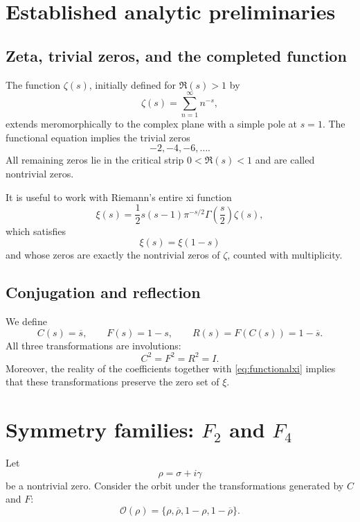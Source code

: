 \documentclass[11pt]{amsart}
\theoremstyle{definition}
\theoremstyle{remark}
\begin{document}
\section{Established analytic preliminaries}
\subsection{Zeta, trivial zeros, and the completed function}
The function $\zeta(s)$, initially defined for $\Re(s)>1$ by
\begin{equation}
  \zeta(s)=\sum_{n=1}^{\infty}n^{-s},
\end{equation}
extends meromorphically to the complex plane with a simple pole at $s=1$. The functional equation implies the trivial zeros
\begin{equation}
  -2,-4,-6,\ldots.
\end{equation}
All remaining zeros lie in the critical strip $0<\Re(s)<1$ and are called nontrivial zeros.

It is useful to work with Riemann's entire xi function
\begin{equation}\label{eq:xi}
 \xi(s)=\frac12 s(s-1)\pi^{-s/2}\Gamma\!\left(\frac{s}{2}\right)\zeta(s),
\end{equation}
which satisfies
\begin{equation}\label{eq:functionalxi}
   \xi(s)=\xi(1-s)
\end{equation}
and whose zeros are exactly the nontrivial zeros of $\zeta$, counted with multiplicity.

\subsection{Conjugation and reflection}
We define
\begin{equation}\label{eq:CFR}
  C(s)=\overline{s},\qquad F(s)=1-s,\qquad R(s)=F(C(s))=1-\overline{s}.
\end{equation}
All three transformations are involutions:
\begin{equation}
 C^2=F^2=R^2=I.
\end{equation}
Moreover, the reality of the coefficients together with \eqref{eq:functionalxi} implies that these transformations preserve the zero set of $\xi$.

\section{Symmetry families: $F_2$ and $F_4$}
Let
\begin{equation}
 \rho=\sigma+i\gamma
\end{equation}
be a nontrivial zero. Consider the orbit under the transformations generated by $C$ and $F$:
\begin{equation}\label{eq:orbit}
 \mathcal O(\rho)=\{\rho,\overline\rho,1-\rho,1-\overline\rho\}.
\end{equation}
\end{document}
